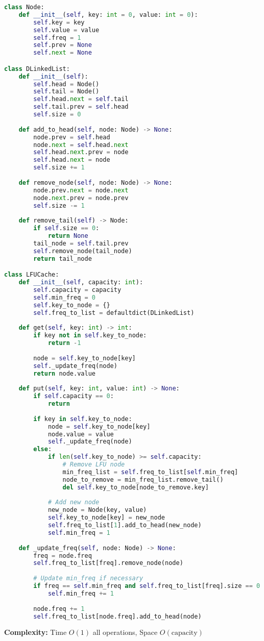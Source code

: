 \documentclass[10pt, a4paper]{article}
\begin{document}
\begin{lstlisting}[language=Python]
class Node:
    def __init__(self, key: int = 0, value: int = 0):
        self.key = key
        self.value = value
        self.freq = 1
        self.prev = None
        self.next = None

class DLinkedList:
    def __init__(self):
        self.head = Node()
        self.tail = Node()
        self.head.next = self.tail
        self.tail.prev = self.head
        self.size = 0
    
    def add_to_head(self, node: Node) -> None:
        node.prev = self.head
        node.next = self.head.next
        self.head.next.prev = node
        self.head.next = node
        self.size += 1
    
    def remove_node(self, node: Node) -> None:
        node.prev.next = node.next
        node.next.prev = node.prev
        self.size -= 1
    
    def remove_tail(self) -> Node:
        if self.size == 0:
            return None
        tail_node = self.tail.prev
        self.remove_node(tail_node)
        return tail_node

class LFUCache:
    def __init__(self, capacity: int):
        self.capacity = capacity
        self.min_freq = 0
        self.key_to_node = {}
        self.freq_to_list = defaultdict(DLinkedList)
    
    def get(self, key: int) -> int:
        if key not in self.key_to_node:
            return -1
        
        node = self.key_to_node[key]
        self._update_freq(node)
        return node.value
    
    def put(self, key: int, value: int) -> None:
        if self.capacity == 0:
            return
        
        if key in self.key_to_node:
            node = self.key_to_node[key]
            node.value = value
            self._update_freq(node)
        else:
            if len(self.key_to_node) >= self.capacity:
                # Remove LFU node
                min_freq_list = self.freq_to_list[self.min_freq]
                node_to_remove = min_freq_list.remove_tail()
                del self.key_to_node[node_to_remove.key]
            
            # Add new node
            new_node = Node(key, value)
            self.key_to_node[key] = new_node
            self.freq_to_list[1].add_to_head(new_node)
            self.min_freq = 1
    
    def _update_freq(self, node: Node) -> None:
        freq = node.freq
        self.freq_to_list[freq].remove_node(node)
        
        # Update min_freq if necessary
        if freq == self.min_freq and self.freq_to_list[freq].size == 0:
            self.min_freq += 1
        
        node.freq += 1
        self.freq_to_list[node.freq].add_to_head(node)
\end{lstlisting}
\textbf{Complexity:} Time $O(1)$ all operations, Space $O(\text{capacity})$
\end{document}

